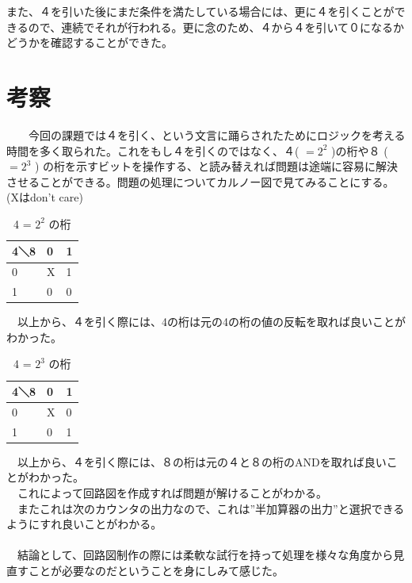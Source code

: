 \documentclass{scrartcl}
\begin{document}
また、４を引いた後にまだ条件を満たしている場合には、更に４を引くことができるので、連続でそれが行われる。更に念のため、４から４を引いて０になるかどうかを確認することができた。\\

\section{考察}
\label{sec:orge952ebd}
　　今回の課題では４を引く、という文言に踊らされたためにロジックを考える時間を多く取られた。これをもし４を引くのではなく、４( \(=2^2\) )の桁や８ ( \(=2^3\) ) の桁を示すビットを操作する、と読み替えれば問題は途端に容易に解決させることができる。問題の処理についてカルノー図で見てみることにする。(Xはdon't care)\\

\begin{table}[htbp]
\caption{4 = \(2^2\) の桁}
\centering
\begin{tabular}{|l|l|l|}
\hline
4＼8 & 0 & 1\\
\hline
0 & X & 1\\
1 & 0 & 0\\
\hline
\end{tabular}
\end{table}

　以上から、４を引く際には、4の桁は元の4の桁の値の反転を取れば良いことがわかった。\\

\begin{table}[htbp]
\caption{4 = \(2^3\) の桁}
\centering
\begin{tabular}{|l|l|l|}
\hline
4＼8 & 0 & 1\\
\hline
0 & X & 0\\
1 & 0 & 1\\
\hline
\end{tabular}
\end{table}

　以上から、４を引く際には、８の桁は元の４と８の桁のANDを取れば良いことがわかった。\\

　これによって回路図を作成すれば問題が解けることがわかる。\\
　またこれは次のカウンタの出力なので、これは”半加算器の出力”と選択できるようにすれ良いことがわかる。\\
　\\
　結論として、回路図制作の際には柔軟な試行を持って処理を様々な角度から見直すことが必要なのだということを身にしみて感じた。\\
\end{document}
